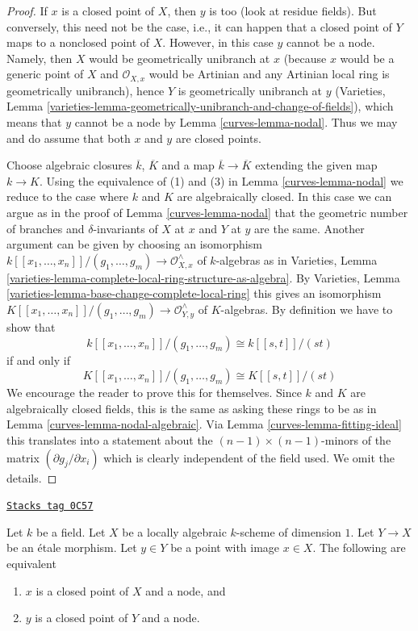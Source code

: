 \begin{proof}

If $x$ is a closed point of $X$, then $y$ is too (look at residue fields).
But conversely, this need not be the case, i.e., it can happen that a
closed point of $Y$ maps to a nonclosed point of $X$. However, in this
case $y$ cannot be a node. Namely, then $X$ would be geometrically
unibranch at $x$ (because $x$ would be a generic point of $X$ and
$\mathcal{O}_{X, x}$ would be Artinian and any Artinian local ring is
geometrically unibranch), hence $Y$ is geometrically unibranch at $y$
(Varieties, Lemma
\ref{varieties-lemma-geometrically-unibranch-and-change-of-fields}),
which means that $y$ cannot be a node by Lemma \ref{curves-lemma-nodal}.
Thus we may and do assume that both $x$ and $y$ are closed points.

\medskip\noindent
Choose algebraic closures $\overline{k}$, $\overline{K}$
and a map $\overline{k} \to \overline{K}$ extending the
given map $k \to K$. Using the equivalence of (1) and (3)
in Lemma \ref{curves-lemma-nodal}
we reduce to the case where $k$ and $K$ are algebraically closed.
In this case we can argue as in the proof of
Lemma \ref{curves-lemma-nodal} that the geometric number of branches
and $\delta$-invariants of $X$ at $x$ and $Y$ at $y$ are the same.
Another argument can be given by choosing an isomorphism
$k[[x_1, \ldots, x_n]]/(g_1, \ldots, g_m) \to \mathcal{O}_{X, x}^\wedge$
of $k$-algebras as in Varieties, Lemma
\ref{varieties-lemma-complete-local-ring-structure-as-algebra}.
By Varieties, Lemma \ref{varieties-lemma-base-change-complete-local-ring}
this gives an isomorphism
$K[[x_1, \ldots, x_n]]/(g_1, \ldots, g_m) \to \mathcal{O}_{Y, y}^\wedge$
of $K$-algebras. By definition we have to show that
$$
k[[x_1, \ldots, x_n]]/(g_1, \ldots, g_m) \cong k[[s, t]]/(st)
$$
if and only if
$$
K[[x_1, \ldots, x_n]]/(g_1, \ldots, g_m) \cong K[[s, t]]/(st)
$$
We encourage the reader to prove this for themselves.
Since $k$ and $K$ are algebraically closed fields, this is the same as
asking these rings to be as in Lemma \ref{curves-lemma-nodal-algebraic}.
Via Lemma \ref{curves-lemma-fitting-ideal} this translates into a statement
about the $(n - 1) \times (n - 1)$-minors of the matrix
$(\partial g_j/\partial x_i)$ which is clearly independent of the
field used. We omit the details.
\end{proof}

\begin{lemma}
\label{curves-lemma-node-etale-local}
\href{https://stacks.math.columbia.edu/tag/0C57}{\texttt{Stacks tag 0C57}}

Let $k$ be a field. Let $X$ be a locally algebraic
$k$-scheme of dimension $1$. Let $Y \to X$ be an \'etale morphism.
Let $y \in Y$ be a point with image $x \in X$. The following are equivalent
\begin{enumerate}
\item $x$ is a closed point of $X$ and a node, and
\item $y$ is a closed point of $Y$ and a node.
\end{enumerate}
\end{lemma}

